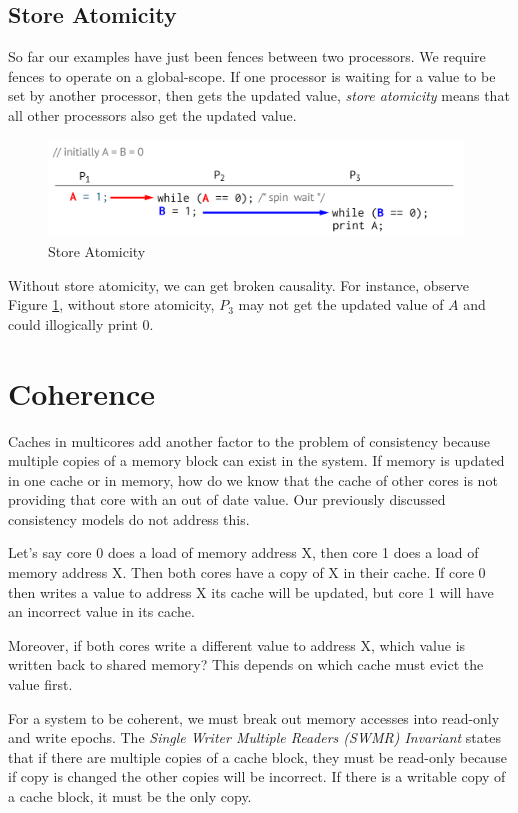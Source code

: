 \documentclass{article}
\begin{document}
\subsection{Store Atomicity}

So far our examples have just been fences between two processors. We require fences to operate on a global-scope. If one processor is waiting for a value to be set by another processor, then gets the updated value, \textit{store atomicity} means that all other processors also get the updated value. 
 \begin{figure}[ht!]
\centering
\includegraphics[width=110mm]{img/store.png}
\caption{Store Atomicity}
\label{Atom}
\end{figure}
 
Without store atomicity, we can get broken causality. For instance, observe Figure \ref{Atom}, without store atomicity, $P_3$ may not get the updated value of $A$ and could illogically print 0.

\section{Coherence}

Caches in multicores add another factor to the problem of consistency because multiple copies of a memory block can exist in the system. If memory is updated in one cache or in memory, how do we know that the cache of other cores is not providing that core with an out of date value. Our previously discussed consistency models do not address this.

Let's say core 0 does a load of memory address X, then core 1 does a load of memory address X. Then both cores have a copy of X in their cache. If core 0 then writes a value to address X its cache will be updated, but core 1 will have an incorrect value in its cache. 

Moreover, if both cores write a different value to address X, which value is written back to shared memory? This depends on which cache must evict the value first.

For a system to be coherent, we must break out memory accesses into read-only and write epochs. The \textit{Single Writer Multiple Readers (SWMR) Invariant} states that if there are multiple copies of a cache block, they must be read-only because if copy is changed the other copies will be incorrect. If there is a writable copy of a cache block, it must be the only copy.
\end{document}
